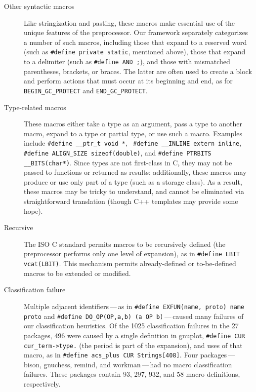 \documentclass[11pt]{article}
\def\numpackages{27}
\newcommand{\pkg}[1]{\textsf{#1}}
\begin{document}
\begin{description}
\item[Other syntactic macros]  Like stringization and pasting, these
  macros make essential use of the unique features of the preprocessor.
  Our framework separately categorizes a number of such macros, including
  those that expand to a reserved word (such as {\tt \#define private
  static}, mentioned above), those that expand to a delimiter (such as
{\tt \#define AND ;}), and those with mismatched parentheses, brackets, or
braces.  The latter are often used to create a block and perform actions
that must occur at its beginning and end, as for \verb|BEGIN_GC_PROTECT|
and \verb|END_GC_PROTECT|.

\item[Type-related macros]  These macros either take a type as an argument, pass
  a type to another macro, expand to a type or partial type, or use such a
  macro.  Examples include {\tt \#define \verb|__ptr_t| void *}, {\tt
  \#define \verb|__INLINE| extern inline}, {\tt \#define \verb|ALIGN_SIZE|
sizeof(double)}, and {\tt \#define PTRBITS \verb|__BITS|(char*)}.  Since
types are not first-class in C, they may not be passed to functions or
returned as results; additionally, these macros may produce or use only
part of a type (such as a storage class).  As a result, these macros may be
tricky to understand, and cannot be eliminated via straightforward
translation (though C++ templates may provide some hope).

\item[Recursive]  The ISO C standard permits macros to be recursively
  defined (the preprocessor performs only one level of expansion), as in
  {\tt \#define LBIT vcat(LBIT)}.  This mechanism permits already-defined
  or to-be-defined macros to be extended or modified.

\item[Classification failure]  Multiple adjacent identifiers\,---\,as in
  {\tt \#define EXFUN(name, proto) name proto} and {\tt \#define
  \verb|DO_OP|(OP,a,b) (a OP b)}\,---\,caused many failures of our
  classification heuristics.  Of the 1025 classification failures in the
  {\numpackages} packages, 496 were caused by a single definition in
  \pkg{gnuplot}, {\tt \#define CUR \verb|cur_term->type.|} (the period is
  part of the expansion), and uses of that macro, as in {\tt \#define
  \verb|acs_plus| CUR Strings[408]}.  Four packages\,---\,\pkg{bison},
  \pkg{gnuchess}, \pkg{remind}, and \pkg{workman}\,---\,had no macro
  classification failures.  These packages contain 93, 297, 932, and 58 macro
  definitions, respectively.



\end{description}
\end{document}
